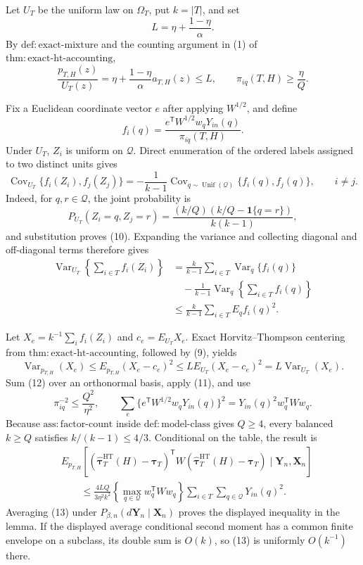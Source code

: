 Let \(U_T\) be the uniform law on \(\Omega_T\), put \(k=|T|\), and set
\[
L=\eta+\frac{1-\eta}{\alpha}.
\]
By \(\mathrm{def{:}exact\text{-}mixture}\) and the counting argument in (1) of \(\mathrm{thm{:}exact\text{-}ht\text{-}accounting}\),
\[
\frac{p_{T,H}(z)}{U_T(z)}
=\eta+\frac{1-\eta}{\alpha}a_{T,H}(z)\leq L,
\qquad
\pi_{iq}(T,H)\geq\frac{\eta}{Q}.
\tag{9}
\]

Fix a Euclidean coordinate vector \(e\) after applying \(W^{1/2}\), and define
\[
f_i(q)=
\frac{e^{\mathsf T}W^{1/2}w_qY_{in}(q)}
{\pi_{iq}(T,H)}.
\]
Under \(U_T\), \(Z_i\) is uniform on \(\mathcal Q\).  Direct enumeration of the ordered labels assigned to two distinct units gives
\[
\operatorname{Cov}_{U_T}\{f_i(Z_i),f_j(Z_j)\}
=-\frac1{k-1}
\operatorname{Cov}_{q\sim\operatorname{Unif}(\mathcal Q)}
\{f_i(q),f_j(q)\},
\qquad i\ne j.
\tag{10}
\]
Indeed, for \(q,r\in\mathcal Q\), the joint probability is
\[
P_{U_T}(Z_i=q,Z_j=r)
=\frac{(k/Q)(k/Q-\mathbf 1\{q=r\})}{k(k-1)},
\]
and substitution proves (10).  Expanding the variance and collecting diagonal and off-diagonal terms therefore gives
\[
\begin{aligned}
\operatorname{Var}_{U_T}\!\left\{\sum_{i\in T}f_i(Z_i)\right\}
&=\frac{k}{k-1}\sum_{i\in T}\operatorname{Var}_{q}\{f_i(q)\}\\
&\quad-\frac1{k-1}
\operatorname{Var}_{q}\!\left\{\sum_{i\in T}f_i(q)\right\}\\
&\leq\frac{k}{k-1}\sum_{i\in T}E_q f_i(q)^2.
\end{aligned}
\tag{11}
\]

Let \(X_e=k^{-1}\sum_i f_i(Z_i)\) and \(c_e=E_{U_T}X_e\).  Exact Horvitz--Thompson centering from \(\mathrm{thm{:}exact\text{-}ht\text{-}accounting}\), followed by (9), yields
\[
\operatorname{Var}_{p_{T,H}}(X_e)
\leq E_{p_{T,H}}(X_e-c_e)^2
\leq L E_{U_T}(X_e-c_e)^2
=L\operatorname{Var}_{U_T}(X_e).
\tag{12}
\]
Sum (12) over an orthonormal basis, apply (11), and use
\[
\pi_{iq}^{-2}\leq\frac{Q^2}{\eta^2},
\qquad
\sum_e\{e^{\mathsf T}W^{1/2}w_qY_{in}(q)\}^2
=Y_{in}(q)^2w_q^{\mathsf T}Ww_q.
\]
Because \(\mathrm{ass{:}factor\text{-}count}\) inside \(\mathrm{def{:}model\text{-}class}\) gives \(Q\geq4\), every balanced \(k\geq Q\) satisfies \(k/(k-1)\leq4/3\).  Conditional on the table, the result is
\[
\begin{aligned}
&E_{p_{T,H}}\!\left[
(\widehat{\boldsymbol\tau}^{\mathrm{HT}}_T(H)-\boldsymbol\tau_T)^{\mathsf T}
W(\widehat{\boldsymbol\tau}^{\mathrm{HT}}_T(H)-\boldsymbol\tau_T)
\mid\mathbf Y_n,\mathbf X_n\right]\\
&\qquad\leq
\frac{4LQ}{3\eta^2k^2}
\left\{\max_{q\in\mathcal Q}w_q^{\mathsf T}Ww_q\right\}
\sum_{i\in T}\sum_{q\in\mathcal Q}Y_{in}(q)^2.
\end{aligned}
\tag{13}
\]
Averaging (13) under \(P_{\beta,n}(d\mathbf Y_n\mid\mathbf X_n)\) proves the displayed inequality in the lemma.  If the displayed average conditional second moment has a common finite envelope on a subclass, its double sum is \(O(k)\), so (13) is uniformly \(O(k^{-1})\) there.

